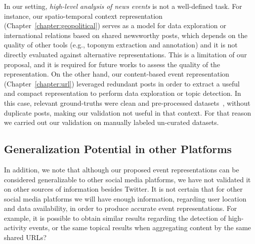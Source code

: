 In our setting, {\em high-level analysis of news events} is not a well-defined
task.
%
For instance, our spatio-temporal context representation
(Chapter~\ref{chapter:geopolitical}) serves as a model for data exploration or
international relations based on shared newsworthy posts, which depends on the
quality of other tools (e.g., toponym extraction and annotation) and it is not
directly evaluated against alternative representations.
%
This is a limitation of our proposal, and it is required for future works to
assess the quality of the representation.
%
On the other hand, our content-based event representation
(Chapter~\ref{chapter:url}) leveraged redundant posts in order to extract a
useful and compact representation to perform data exploration or topic
detection.
%
In this case, relevant ground-truths were clean and pre-processed 
datasets~\cite{ICWSM1817816}, without duplicate posts, making our validation not
useful in that context.
%
For that reason we carried out our validation on manually labeled un-curated
datasets.



\subsection*{Generalization Potential in other Platforms}
In addition, we note that although our proposed event representations can be
considered generalizable to other social media platforms, we have not validated
it on other sources of information besides Twitter. 
%
It is not certain that for other social media platforms we will have enough
information, regarding user location and data availability, in order to produce
accurate event representations.
%
For example, it is possible to obtain similar results regarding the detection of
high-activity events, or the same topical results when aggregating content by
the same shared URLs?


